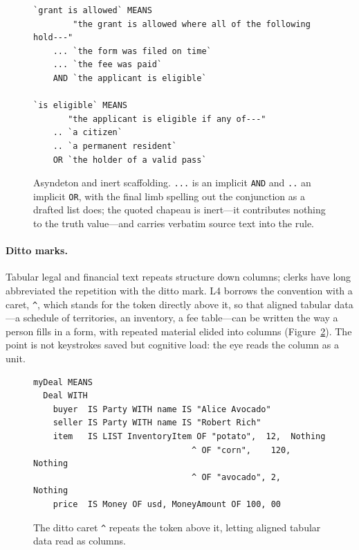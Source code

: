\documentclass[sigconf,nonacm]{acmart}
\newcommand{\code}[1]{\texttt{\small #1}}
\begin{document}
\begin{figure}[t]
\begin{lstlisting}
`grant is allowed` MEANS
        "the grant is allowed where all of the following hold---"
    ... `the form was filed on time`
    ... `the fee was paid`
    AND `the applicant is eligible`

`is eligible` MEANS
       "the applicant is eligible if any of---"
    .. `a citizen`
    .. `a permanent resident`
    OR `the holder of a valid pass`
\end{lstlisting}
\caption{Asyndeton and inert scaffolding. \code{...} is an implicit \code{AND}
and \code{..} an implicit \code{OR}, with the final limb spelling out the
conjunction as a drafted list does; the quoted chapeau is inert---it contributes
nothing to the truth value---and carries verbatim source text into the rule.}
\label{fig:asyndeton}
\end{figure}

\paragraph{Ditto marks.}
Tabular legal and financial text repeats structure down columns; clerks have
long abbreviated the repetition with the ditto mark. L4 borrows the
convention with a caret, \code{\textasciicircum}, which stands for the token directly above
it, so that aligned tabular data---a schedule of territories, an inventory,
a fee table---can be written the way a person fills in a form, with repeated
material elided into columns (Figure~\ref{fig:ditto}). The point is not
keystrokes saved but cognitive load: the eye reads the column as a unit.

\begin{figure}[t]
\begin{lstlisting}
myDeal MEANS
  Deal WITH
    buyer  IS Party WITH name IS "Alice Avocado"
    seller IS Party WITH name IS "Robert Rich"
    item   IS LIST InventoryItem OF "potato",  12,  Nothing
                                ^ OF "corn",    120, Nothing
                                ^ OF "avocado", 2,   Nothing
    price  IS Money OF usd, MoneyAmount OF 100, 00
\end{lstlisting}
\caption{The ditto caret \code{\textasciicircum} repeats the token above it, letting
aligned tabular data read as columns.}
\label{fig:ditto}
\end{figure}
\end{document}

